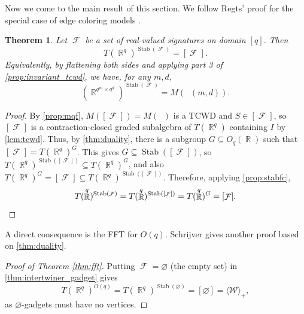 \documentclass{article}
\newtheorem{theorem}{Theorem}\newtheorem{lemma}[theorem]{Lemma}\newtheorem{proposition}[theorem]{Proposition}\newtheorem{corollary}[theorem]{Corollary}\newtheorem{definition}[theorem]{Definition}\newtheorem{claim}[theorem]{Claim}\newtheorem{remark}[theorem]{Remark}\newtheorem{conjecture}[theorem]{Conjecture}
\DeclareMathOperator{\rr}{\mathbb{R}}
\DeclareMathOperator{\fc}{\mathcal{F}}
\DeclareMathOperator{\qk}{\mathfrak{Q}_{\mathcal{F}}}
\DeclareMathOperator{\stab}{Stab}
\begin{document}
Now we come to the main result of this section. We follow Regts' proof
for the special case of edge coloring models \cite[Theorem 6.8]{regts}.
\begin{theorem}
    \label{thm:intertwiner_gadget}
    Let $\fc$ be a set of real-valued signatures on domain $[q]$. Then
    \[
        T(\rr^q)^{\stab(\fc)} = [\fc].
    \]
    Equivalently, by flattening both sides and applying part 3 of \autoref{prop:invariant_tcwd},
    we have, for any $m,d$,
    \[
        \left(\rr^{q^m\times q^d}\right)^{\stab(\fc)} = M(\qk(m,d)).
    \]
\end{theorem}
\begin{proof}
    By \autoref{prop:mqf}, $M([\fc]) = M(\qk)$ is a TCWD and
    $S \in [\fc]$, so $[\fc]$ is a contraction-closed
    graded subalgebra of $T(\rr^q)$ containing $I$ by \autoref{lem:tcwd}. Thus, by \autoref{thm:duality},
    there is a subgroup $G \subseteq O_q(\rr)$ such that $[\fc] = T(\rr^q)^G$.
    This gives $G \subseteq \stab([\fc])$, so $T(\rr^q)^{\stab([\fc])} \subseteq T(\rr^q)^G$, and 
    also $T(\rr^q)^G = [\fc] \subseteq T(\rr^q)^{\stab([\fc])}$. Therefore,
    applying \autoref{prop:stabfc},
    \[
        T(\rr^q)^{\stab(\fc)} = T(\rr^q)^{\stab([\fc])} = T(\rr^q)^G = [\fc].
        \qedhere
    \]
\end{proof}
A direct consequence is the FFT for $O(q)$. Schrijver \cite{schrijver_tensor_2008} gives another 
proof based on \autoref{thm:duality}.
\begin{proof}[Proof of Theorem \ref{thm:fft}]
    Putting $\fc = \varnothing$ (the empty set) in \autoref{thm:intertwiner_gadget} gives
    \[
        T(\rr^q)^{O(q)} = T(\rr^q)^{\stab(\varnothing)} = [\varnothing] = \langle \mathcal{W} \rangle_+,
    \]
    as $\varnothing$-gadgets must have no vertices.
\end{proof}
\end{document}
